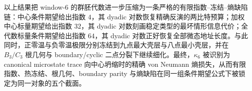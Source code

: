 \noindent
以上结果把 window-\(6\) 的群胚代数进一步压缩为一条严格的有限指数--冻结--熵缺陷链：中心条件期望给出指数 \(4\)，其 dyadic 对数恢复精确反演的两比特预算；加权中心标量期望给出指数 \(32\)，其 dyadic 对数刻画稳定类型的最坏情形信息代价；全代数标量条件期望给出指数 \(64\)，其 dyadic 对数正好恢复全部微态地址长度。与此同时，正零温与负零温极限分别冻结到九点最大壳层与八点最小壳层，并在 \(B_3/C_3\) 根几何与 boundary/cyclic 二点分裂下继续细化。最终，\(\kappa_6\) 被识别为 canonical microstate trace 向中心坍缩时的精确 von Neumann 熵损失，从而有限指数、热冻结、根几何、boundary parity 与熵缺陷在同一组条件期望公式下被锁定为同一对象的五个截面。

\endinput
